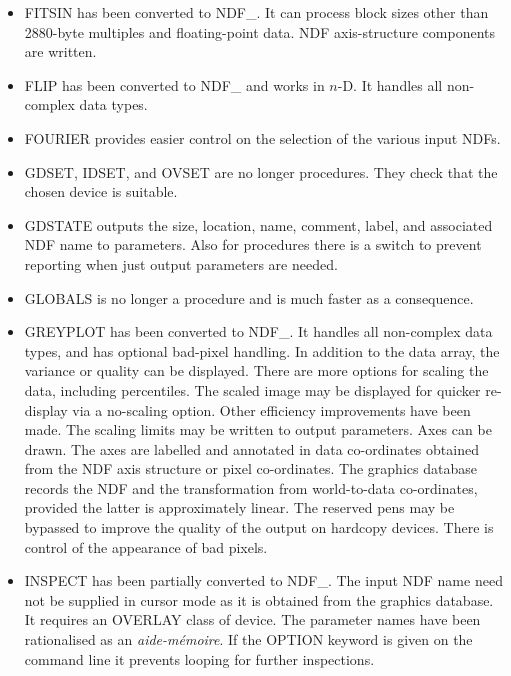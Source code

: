 {\begin{itemize}
  \item FITSIN has been converted to NDF\_.  It can process block sizes
    other than 2880-byte multiples and floating-point data.  NDF
    axis-structure components are written.

  \item FLIP has been converted to NDF\_ and works in $n$-D.  It handles all
    non-complex data types.

  \item FOURIER provides easier control on the selection of the
    various input NDFs.

 \item GDSET, IDSET, and OVSET are no longer procedures.  They check that
    the chosen device is suitable.
    
  \item GDSTATE outputs the size, location, name, comment, label, and
    associated NDF name to parameters.  Also for procedures there is
    a switch to prevent reporting when just output parameters are
    needed. 
   
  \item GLOBALS is no longer a procedure and is much faster as a consequence.

  \item GREYPLOT has been converted to NDF\_.  It handles all
    non-complex data types, and has optional bad-pixel handling.  In
    addition to the data array, the variance or quality can be
    displayed.  There are more options for scaling the data,
    including percentiles.  The scaled image may be displayed for
    quicker re-display via a no-scaling option.  Other efficiency
    improvements have been made.  The scaling limits may be written
    to output parameters.  Axes can be drawn.  The axes are labelled
    and annotated in data co-ordinates obtained from the NDF axis
    structure or pixel co-ordinates.  The graphics database records
    the NDF and the transformation from world-to-data co-ordinates,
    provided the latter is approximately linear.  The reserved pens
    may be bypassed to improve the quality of the output on hardcopy
    devices.  There is control of the appearance of bad pixels.

  \item INSPECT has been partially converted to NDF\_.  The input NDF
    name need not be supplied in cursor mode as it is obtained from
    the graphics database.  It requires an OVERLAY class of device.
    The parameter names have been rationalised as an {\it aide-m\'{e}moire}.
    If the OPTION keyword is given on the command line it prevents 
    looping for further inspections.


\end{itemize}}
